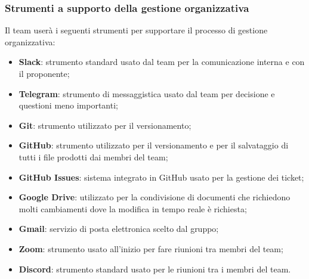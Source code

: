 \subsubsection{Strumenti a supporto della gestione organizzativa}
Il team userà i seguenti strumenti per supportare il processo di gestione organizzativa:
\begin{itemize}
\item \textbf{Slack}: strumento standard usato dal team per la comunicazione interna e con il proponente;
\item \textbf{Telegram}: strumento di messaggistica usato dal team per decisione e questioni meno importanti; 
\item \textbf{Git}: strumento utilizzato per il versionamento;
\item \textbf{GitHub}: strumento utilizzato per il versionamento e per il salvataggio di tutti i file prodotti dai membri del team; 
\item \textbf{GitHub Issues}: sistema integrato in GitHub usato per la gestione dei ticket;
\item \textbf{Google Drive}: utilizzato per la condivisione di documenti che richiedono molti cambiamenti dove la modifica in tempo reale è richiesta;
\item \textbf{Gmail}: servizio di posta elettronica scelto dal gruppo;
\item \textbf{Zoom}: strumento usato all'inizio per fare riunioni tra membri del team;
\item \textbf{Discord}: strumento standard usato per le riunioni tra i membri del team. 
\end{itemize}
